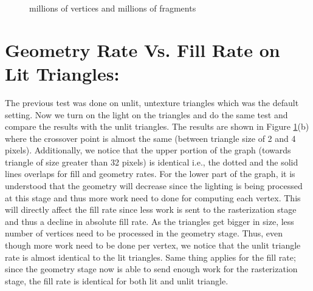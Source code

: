 \documentclass[12pt] {article}
\begin{document}
\begin{figure}[!tbh]
 \centering  
  \caption{millions of vertices and millions of fragments}
   \label{fig:fill_geo1}
\end{figure} 


\section{Geometry Rate Vs. Fill Rate on Lit Triangles:}
The previous test was done on unlit, untexture triangles which was the default setting. Now we turn on the light on the triangles and do the same test and compare the results with the unlit triangles. The results are shown in Figure \ref{fig:fill_geo1}(b) where the crossover point is almost the same (between triangle size of 2 and 4 pixels). Additionally, we notice that the upper portion of the graph (towards triangle of size greater than 32 pixels) is identical i.e., the dotted and the solid lines overlaps for fill and geometry rates. For the lower part of the graph, it is understood that the geometry will decrease since the lighting is being processed at this stage and thus more work need to done for computing each vertex. This will directly affect the fill rate since less work is sent to the rasterization stage and thus a decline in absolute fill rate. As the triangles get bigger in size, less number of vertices need to be processed in the geometry stage. Thus, even though more work need to be done per vertex, we notice that the unlit triangle rate is almost identical to the lit triangles. Same thing applies for the fill rate; since the geometry stage now is able to send enough work for the rasterization stage, the fill rate is identical for both lit and unlit triangle. 
\end{document}
